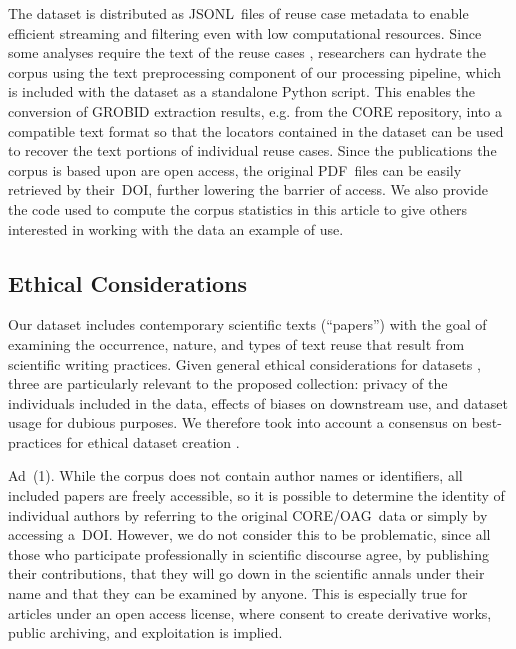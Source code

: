 The dataset is distributed as JSONL~files of reuse case metadata to enable efficient streaming and filtering even with low computational resources. Since some analyses require the text of the reuse cases \webisReuseCorpus, researchers can hydrate the corpus using the text preprocessing component of our processing pipeline, which is included with the dataset as a standalone Python script. This enables the conversion of GROBID extraction results, e.g. from the CORE repository, into a compatible text format so that the locators contained in the dataset can be used to recover the text portions of individual reuse cases. Since the publications the corpus is based upon are open access, the original PDF~files can be easily retrieved by their~DOI, further lowering the barrier of access. We also provide the code used to compute the corpus statistics in this article to give others interested in working with the data an example of use.

\subsection*{Ethical Considerations}

Our dataset includes contemporary scientific texts (``papers'') with the goal of examining the occurrence, nature, and types of text reuse that result from scientific writing practices. Given general ethical considerations for datasets \cite{peng:2021}, three are particularly relevant to the proposed collection:
\Ni
privacy of the individuals included in the data, 
\Nii
effects of biases on downstream use, and
\Niii
dataset usage for dubious purposes.
We therefore took into account a consensus on best-practices for ethical dataset creation \cite{mieskes:2017,leidner:2017,gebru:2021}.

Ad~(1).
While the corpus does not contain author names or identifiers, all included papers are freely accessible, so it is possible to determine the identity of individual authors by referring to the original CORE/OAG~data or simply by accessing a~DOI. However, we do not consider this to be problematic, since all those who participate professionally in scientific discourse agree, by publishing their contributions, that they will go down in the scientific annals under their name and that they can be examined by anyone. This is especially true for articles under an open access license, where consent to create derivative works, public archiving, and exploitation is implied.

